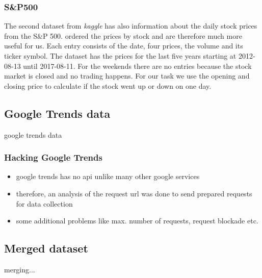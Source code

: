 \subsubsection{S\&P500}
\label{subsub:sp5000}
The second dataset from \textit{kaggle} has also information about the daily stock prices from the S\&P 500. \cite{SP500} ordered the prices by stock and are therefore much more useful for us. Each entry consists of the date, four prices, the volume and its ticker symbol. The dataset has the prices for the last five years starting at 2012-08-13 until 2017-08-11. For the weekends there are no entries because the stock market is closed and no trading happens. For our task we use the opening and closing price to calculate if the stock went up or down on one day.


\subsection{Google Trends data}
\label{subsec:gtdata}
google trends data

\subsubsection{Hacking Google Trends}
\label{subsub:hackinggt}
\begin{itemize}
	\item google trends has no api unlike many other google services
	\item therefore, an analysis of the request url was done to send prepared requests for data collection
	\item some additional problems like max. number of requests, request blockade etc.
\end{itemize}


\subsection{Merged dataset}
\label{subsec:merged}
merging...